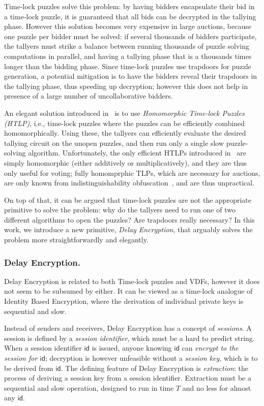 \documentclass{llncs}
\newcommand{\id}{\mathsf{id}}
\begin{document}
Time-lock puzzles solve this problem: by having bidders encapsulate
their bid in a time-lock puzzle, it is guaranteed that all bids can be
decrypted in the tallying phase. %
However this solution becomes very expensive in large auctions,
because one puzzle per bidder must be solved: if several thousands of
bidders participate, the tallyers must strike a balance between
running thousands of puzzle solving computations in parallel, and
having a tallying phase that is a thousands times longer than the
bidding phase. %
Since time-lock puzzles use trapdoors for puzzle generation, a
potential mitigation is to have the bidders reveal their trapdoors in
the tallying phase, thus speeding up decryption; however this does not
help in presence of a large number of uncollaborative bidders.

An elegant solution introduced in~\cite{C:MalThy19} is to use
\emph{Homomorphic Time-lock Puzzles (HTLP)}, i.e., time-lock puzzles
where the puzzles can be efficiently combined homomorphically. %
Using these, the tallyers can efficiently evaluate the desired
tallying circuit on the unopen puzzles, and then run only a single
slow puzzle-solving algorithm. %
Unfortunately, the only efficient HTLPs introduced
in~\cite{C:MalThy19} are simply homomorphic (either additively or
multiplicatively), and they are thus only useful for voting; fully
homomprphic TLPs, which are necessary for auctions, are only known
from indistinguishability obfuscation~\cite{FOCS:GGHRSW13}, and are
thus unpractical. %

On top of that, it can be argued that time-lock puzzles are not the
appropriate primitive to solve the problem: why do the tallyers need
to run one of two different algorithms to open the puzzles? Are
trapdoors really necessary? %
In this work, we introduce a new primitive, \emph{Delay Encryption},
that arguably solves the problem more straightforwardly and elegantly.


\subsubsection{Delay Encryption.}
Delay Encryption is related to both Time-lock puzzles and VDFs,
however it does not seem to be subsumed by either. %
It can be viewed as a time-lock analogue of Identity Based Encryption,
where the derivation of individual private keys is sequential and
slow. %

Instead of senders and receivers, Delay Encryption has a concept of
\emph{sessions}. %
A session is defined by a \emph{session identifier}, which must be a
hard to predict string. %
When a session identifier $\id$ is issued, anyone knowing $\id$ can
\emph{encrypt to the session for $\id$}; decryption is however
unfeasible without a \emph{session key}, which is to be derived from
$\id$. %
The defining feature of Delay Encryption is \emph{extraction}: the
process of deriving a session key from a session identifier. %
Extraction must be a sequential and slow operation, designed to run in
time $T$ and no less for almost any $\id$.
\end{document}
